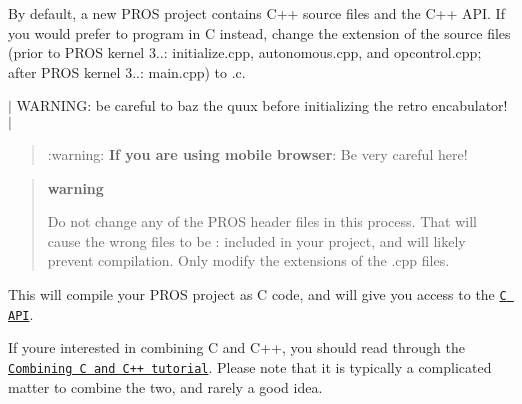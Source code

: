 By default, a new P\+R\+OS project contains C++ source files and the C++ A\+PI. If you would prefer to program in C instead, change the extension of the source files (prior to P\+R\+OS kernel 3..\+: {\ttfamily initialize.\+cpp}, {\ttfamily autonomous.\+cpp}, and {\ttfamily opcontrol.\+cpp}; after P\+R\+OS kernel 3..\+: {\ttfamily main.\+cpp}) to {\ttfamily .c}.

$\vert$ W\+A\+R\+N\+I\+NG\+: be careful to baz the quux before initializing the retro encabulator! $\vert$

\begin{quote}
\+:warning\+: {\bfseries If you are using mobile browser}\+: Be very careful here! \end{quote}


\begin{quote}
{\bfseries warning}

Do not change any of the P\+R\+OS header files in this process. That will cause the wrong files to be \+: included in your project, and will likely prevent compilation. Only modify the extensions of the {\ttfamily .cpp} files.

\end{quote}
This will compile your P\+R\+OS project as C code, and will give you access to the \href{../../api/c/index.html}{\tt C A\+PI}.

If you\textquotesingle{}re interested in combining C and C++, you should read through the \href{../general/combining-c-cpp.html}{\tt Combining C and C++ tutorial}. Please note that it is typically a complicated matter to combine the two, and rarely a good idea. 